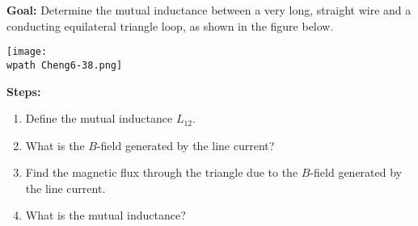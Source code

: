 \documentclass[../../header.tex]{subfiles}
\begin{document}
\textbf{Goal:} Determine the mutual inductance between a very long, straight wire and a conducting equilateral triangle loop, as shown in the figure below.
\begin{center}
\centering
\texttt{[image: \\wpath Cheng6-38.png]}
\end{center}
\textbf{Steps:} 
\begin{enumerate}
\item Define the mutual inductance $L_{12}$.


\item What is the $B$-field generated by the line current?


\item Find the magnetic flux through the triangle due to the $B$-field generated by the line current.


\item What is the mutual inductance?


\end{enumerate}
\end{document}
